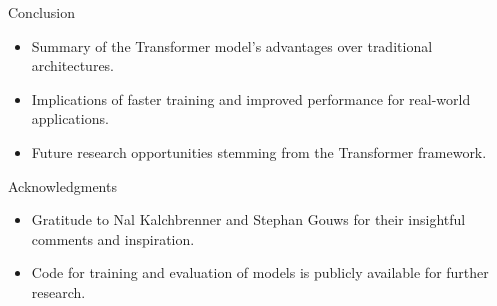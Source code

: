 \documentclass{beamer}
\begin{document}
\begin{frame}{Conclusion}
\begin{itemize}
\item Summary of the Transformer model's advantages over traditional architectures.
\item Implications of faster training and improved performance for real-world applications.
\item Future research opportunities stemming from the Transformer framework.
\end{itemize}
\end{frame}

\begin{frame}{Acknowledgments}
\begin{itemize}
\item Gratitude to Nal Kalchbrenner and Stephan Gouws for their insightful comments and inspiration.
\item Code for training and evaluation of models is publicly available for further research.
\end{itemize}
\end{frame}
\end{document}
